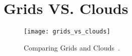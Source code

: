 \chapter{Grids VS. Clouds} \label{chap:ap1}

\begin{figure}[t]
  \begin{center}
    \leavevmode
    \texttt{[image: grids\_vs\_clouds]}
    \caption{Comparing Grids and Clouds~\cite{vaquero}.}
    \label{fig:grids_vs_clouds}
  \end{center}
\end{figure}
\clearpage
